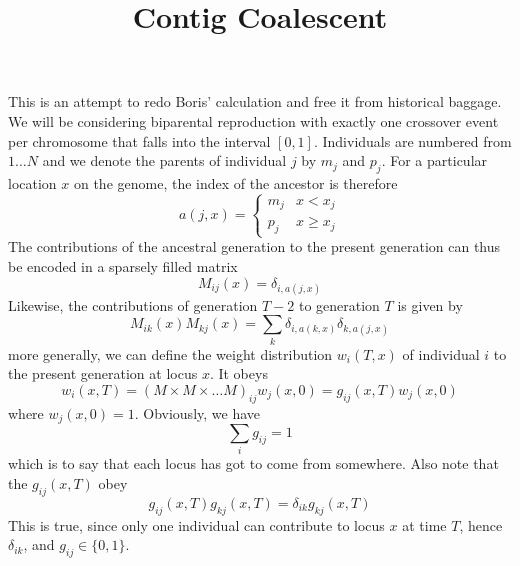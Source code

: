 \documentclass{article}
\begin{document}
\title{Contig Coalescent}
\maketitle
This is an attempt to redo Boris' calculation and free it from
historical baggage. We will be considering biparental reproduction
with exactly one crossover event per chromosome that falls into the
interval $[0,1]$. Individuals are numbered from $1\ldots N$ and we
denote the parents of individual $j$ by $m_j$ and $p_j$. For a
particular location $x$ on the genome, the index of the ancestor is
therefore 
\begin{equation}
  a(j,x) = \begin{cases}
    m_j & x< x_j \\
    p_j & x\geq x_j
  \end{cases}
\end{equation}
The contributions of the ancestral generation to the present
generation can thus be encoded in a sparsely filled matrix
\begin{equation}
  M_{ij}(x)=\delta_{i,a(j,x)}
\end{equation}
Likewise, the contributions of generation $T-2$ to generation $T$ is given by
\begin{equation}
  M_{ik}(x) M_{kj}(x) = \sum_k \delta_{i,a(k,x)}\delta_{k,a(j,x)}
\end{equation}
more generally, we can define the weight distribution $w_i(T,x)$ of
individual $i$ to the present generation at locus $x$. It obeys
\begin{equation}
  w_i(x,T) = (M\times M\times \ldots M)_{ij}w_j(x,0) = g_{ij}(x,T)w_j(x,0)
\end{equation}
where $w_j(x,0)=1$. 
Obviously, we have
\begin{equation}
  \sum_i g_{ij}=1 
\end{equation}
which is to say that each locus has got to come from somewhere. Also
note that the $g_{ij}(x,T)$ obey
\begin{equation}
  g_{ij}(x,T)g_{kj}(x,T) = \delta_{ik}g_{kj}(x,T) 
\end{equation}
This is true, since only one individual can contribute to locus $x$ at
time $T$, hence $\delta_{ik}$, and $g_{ij}\in \{0,1\}$.
\end{document}
